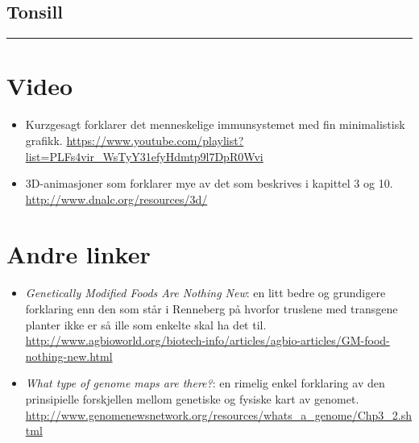 \pagebreak
\begin{centering}\section*{Tonsill}\end{centering}
\hrule height 0.5pt \bigskip

\begin{appendices}
{ %
\renewcommand{\addtocontents}[2]{}
\section{Video}
\begin{itemize}[noitemsep,nolistsep]
	\item Kurzgesagt forklarer det menneskelige immunsystemet med fin minimalistisk grafikk. \url{https://www.youtube.com/playlist?list=PLFs4vir_WsTyY31efyHdmtp9l7DpR0Wvi}
	\item 3D-animasjoner som forklarer mye av det som beskrives i kapittel 3 og 10. \url{http://www.dnalc.org/resources/3d/}
\end{itemize}

\section{Andre linker}
\begin{itemize}[noitemsep,nolistsep]
	\item \emph{Genetically Modified Foods Are Nothing New}: en litt bedre og grundigere forklaring enn den som står i Renneberg på hvorfor truslene med transgene planter ikke er så ille som enkelte skal ha det til. \url{http://www.agbioworld.org/biotech-info/articles/agbio-articles/GM-food-nothing-new.html}
	\item \emph{What type of genome maps are there?}: en rimelig enkel forklaring av den prinsipielle forskjellen mellom genetiske og fysiske kart av genomet. \url{http://www.genomenewsnetwork.org/resources/whats_a_genome/Chp3_2.shtml}
\end{itemize}

}
\end{appendices}

